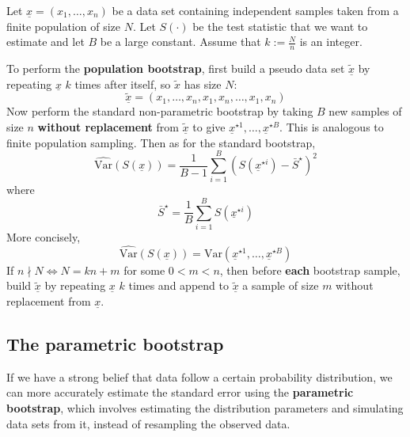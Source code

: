 \begin{definition}
	Let $\underline{x} = (x_1, \dots, x_n)$ be a data set containing independent samples taken from a finite population of size $N$. Let $S(\cdot)$ be the test statistic that we want to estimate and let $B$ be a large constant. Assume that $k := \frac{N}{n}$ is an integer.

	To perform the \textbf{population bootstrap}, first build a pseudo data set $\tilde{\underline{x}}$ by repeating $\underline{x}$ $k$ times after itself, so $\tilde{x}$ has size $N$:
	\[
		\tilde{\underline{x}} = (x_1, \dots, x_n, x_1, x_n, \dots, x_1, x_n)
	\]
	Now perform the standard non-parametric bootstrap by taking $B$ new samples of size $n$ \textbf{without replacement} from $\tilde{\underline{x}}$ to give $\underline{x}^{\star 1}, \dots, \underline{x}^{\star B}$. This is analogous to finite population sampling. Then as for the standard bootstrap,
	\[
		\widehat{\text{Var}}(S(\underline{x})) = \frac{1}{B - 1} \sum_{i = 1}^B {\left( S \left( \underline{x}^{\star i} \right) - \bar{S}^{\star} \right)}^2
	\]
	where
	\[
		\bar{S}^{\star} = \frac{1}{B} \sum_{i = 1}^B S \left( \underline{x}^{\star i} \right)
	\]
	More concisely,
	\[
		\widehat{\text{Var}}(S(\underline{x})) = \text{Var} \left( \underline{x}^{\star 1}, \dots, \underline{x}^{\star B} \right)
	\]
	If $n \nmid N \Longleftrightarrow N = kn + m$ for some $0 < m < n$, then before \textbf{each} bootstrap sample, build $\tilde{\underline{x}}$ by repeating $\underline{x}$ $k$ times and append to $\tilde{\underline{x}}$ a sample of size $m$ without replacement from $\underline{x}$.
\end{definition}

\subsection{The parametric bootstrap}

If we have a strong belief that data follow a certain probability distribution, we can more accurately estimate the standard error using the \textbf{parametric bootstrap}, which involves estimating the distribution parameters and simulating data sets from it, instead of resampling the observed data.

